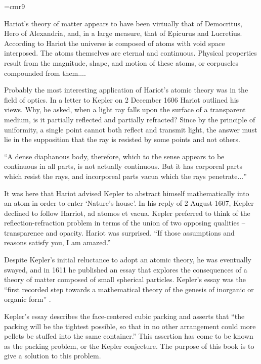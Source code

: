 {
\narrower
\font\ninerm=cmr9
\ninerm

    Hariot's theory of matter appears to have been virtually that of Democritus,  Hero of Alexandria,  and, in a large measure, that of Epicurus
    and Lucretius. According to Hariot the universe is composed of atoms with void space interposed. The atoms themselves are eternal and
    continuous. Physical properties result from the magnitude, shape, and motion of these atoms, or corpuscles compounded from them$\ldots$.

    Probably the most interesting application of Hariot's atomic theory was in the field of optics. In a letter to Kepler on 2 December 1606
    Hariot outlined his views. Why, he asked, when a light ray falls upon the surface of a transparent medium, is it partially reflected and
    partially refracted? Since by the principle of uniformity, a single point cannot both reflect and transmit light, the answer must lie in the
    supposition that the ray is resisted by some points and not others.

    ``A dense diaphanous body, therefore, which to the sense appears to be continuous in all parts, is not actually continuous. But it has
    corporeal parts which resist the rays, and incorporeal parts vacua which the rays penetrate$\ldots$''

    It was here that Hariot advised Kepler to abstract himself mathematically into an atom in order to enter `Nature's house'. In his reply of 2
    August 1607, Kepler declined to follow Harriot, ad atomos et vacua. Kepler preferred to think of the reflection-refraction problem in terms
    of the union of two opposing qualities --
    transparence and opacity. Hariot was surprised. ``If those assumptions and reasons satisfy you, I
    am amazed.'' \cite[p.26]{Kar66}

}

\smallskip
Despite Kepler's initial reluctance to adopt an atomic theory, he
was eventually swayed, and in 1611 he published an essay that
explores the consequences of a theory of matter composed of small
spherical particles.  Kepler's essay was the ``first recorded step
towards a mathematical theory of the genesis of inorganic or
organic form'' \cite[p.v]{Why66}.

Kepler's essay describes
the face-centered cubic packing and asserts that ``the packing will
be the tightest possible, so that in no other arrangement  could more
pellets be stuffed into the same container.''  This assertion has
come to be known as the packing problem, or the Kepler conjecture.   
The purpose of this book is to give a solution to this problem.

